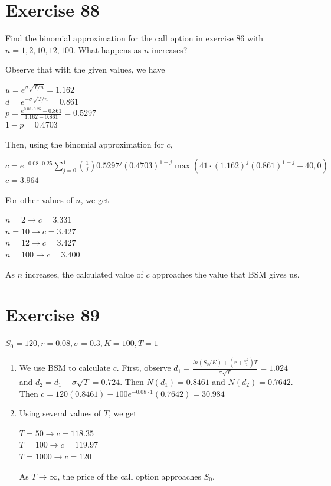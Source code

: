 \documentclass{article}
\begin{document}
\section*{Exercise 88}
Find the binomial approximation for the call option in exercise 86 with $n = 1, 2, 10, 12, 100$. What happens as $n$ increases?
\begin{flushleft}
    Observe that with the given values, we have
    \begin{center}
        $u = e^{\sigma \sqrt{T/n}} = 1.162$ \\
        $d = e^{-\sigma \sqrt{T/n}} = 0.861$ \\
        $p = \frac{e^{0.08 \cdot 0.25} - 0.861}{1.162-0.861} = 0.5297$ \\
        $1-p = 0.4703$
    \end{center}
    Then, using the binomial approximation for $c$,
    \begin{center}
        $c = e^{-0.08 \cdot 0.25} \sum_{j=0}^{1} \binom{1}{j} 0.5297^j (0.4703)^{1-j} \max{(41 \cdot (1.162)^j(0.861)^{1-j} - 40, 0)}$ \\
        $c = 3.964$
    \end{center}
    For other values of $n$, we get
    \begin{center}
        $n = 2 \rightarrow c = 3.331$ \\
        $n = 10 \rightarrow c = 3.427$ \\
        $n = 12 \rightarrow c = 3.427$ \\
        $n = 100 \rightarrow c = 3.400$
    \end{center}
    As $n$ increases, the calculated value of $c$ approaches the value that BSM gives us.
\end{flushleft}

\section*{Exercise 89}
$S_0 = 120, r = 0.08, \sigma = 0.3, K = 100, T = 1$
\begin{flushleft}
    \begin{enumerate}
        \item We use BSM to calculate $c$. First, observe $d_1 = \frac{ln(S_0/K) + (r + \frac{\sigma^2}{2})T}{\sigma \sqrt{T}} = 1.024$ and $d_2 = d_1 - \sigma \sqrt{T} = 0.724$. Then $N(d_1) = 0.8461$ and $N(d_2) = 0.7642$.
            Then $c = 120(0.8461) - 100e^{-0.08 \cdot 1}(0.7642) = 30.984$
        \item Using several values of $T$, we get
            \begin{center}
                $T = 50 \rightarrow c = 118.35$ \\
                $T = 100 \rightarrow c = 119.97$ \\
                $T = 1000 \rightarrow c = 120$
            \end{center}
            As $T \rightarrow \infty$, the price of the call option approaches $S_0$.
    \end{enumerate}
\end{flushleft}
\end{document}
